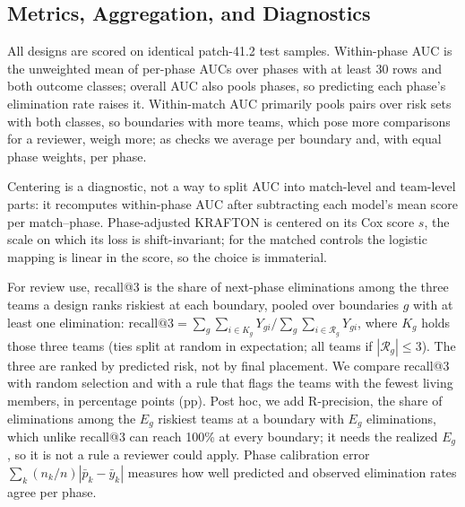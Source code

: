 \documentclass[sigconf,anonymous]{acmart}
\begin{document}
\subsection{Metrics, Aggregation, and Diagnostics}
\label{sec:method:units}
All designs are scored on identical patch-41.2 test samples. Within-phase AUC is the unweighted mean of per-phase AUCs over phases with at least 30 rows and both outcome classes; overall AUC also pools phases, so predicting each phase's elimination rate raises it. Within-match AUC primarily pools pairs over risk sets with both classes, so boundaries with more teams, which pose more comparisons for a reviewer, weigh more; as checks we average per boundary and, with equal phase weights, per phase.

Centering is a diagnostic, not a way to split AUC into match-level and team-level parts: it recomputes within-phase AUC after subtracting each model's mean score per match--phase. Phase-adjusted KRAFTON is centered on its Cox score $s$, the scale on which its loss is shift-invariant; for the matched controls the logistic mapping is linear in the score, so the choice is immaterial.

For review use, recall@3 is the share of next-phase eliminations among the three teams a design ranks riskiest at each boundary, pooled over boundaries $g$ with at least one elimination: $\mathrm{recall@3}=\sum_g\sum_{i\in K_g}Y_{gi}\big/\sum_g\sum_{i\in\mathcal{R}_g}Y_{gi}$, where $K_g$ holds those three teams (ties split at random in expectation; all teams if $|\mathcal{R}_g|\le3$). The three are ranked by predicted risk, not by final placement. We compare recall@3 with random selection and with a rule that flags the teams with the fewest living members, in percentage points (pp). Post hoc, we add R-precision, the share of eliminations among the $E_g$ riskiest teams at a boundary with $E_g$ eliminations, which unlike recall@3 can reach 100\% at every boundary; it needs the realized $E_g$, so it is not a rule a reviewer could apply. Phase calibration error $\sum_k(n_k/n)|\bar p_k-\bar y_k|$ measures how well predicted and observed elimination rates agree per phase.
\end{document}
